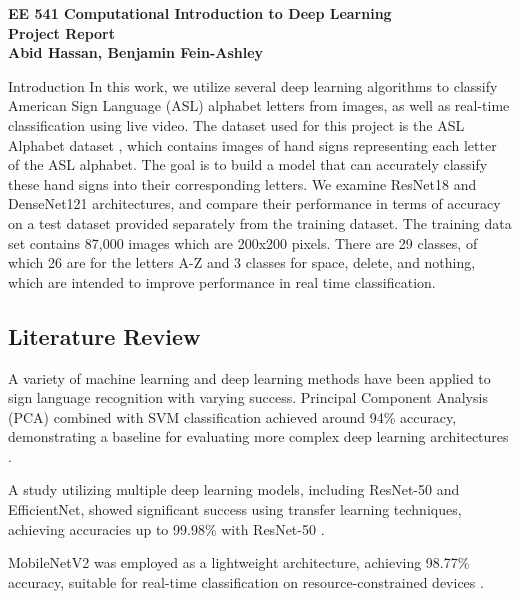 \documentclass[12pt, a4paper]{article}
\newcommand{\coursename}{EE 541 Computational Introduction to Deep Learning}
\newcommand{\doctitle}{Project Report}
\newcommand{\name}{Abid Hassan, Benjamin Fein-Ashley}
\begin{document}
\begin{center}
\small
\textbf{\coursename} \\
\Large
\bfseries
\doctitle \\
\vspace{0.8cm}
\small
{\normalfont\small \name}
\end{center}

\thispagestyle{plain}

\noindent

\newpage

\begin{section}{Introduction}
    In this work, we utilize several deep learning algorithms to classify American Sign Language (ASL) alphabet letters from images, as well as real-time classification using live video. The dataset used for this project is the ASL Alphabet dataset \cite{kaggle2022aslalphabet}, which contains images of hand signs representing each letter of the ASL alphabet. The goal is to build a model that can accurately classify these hand signs into their corresponding letters.
    We examine ResNet18 and DenseNet121 architectures, and compare their performance in terms of accuracy on a test dataset provided separately from the training dataset. The training data set contains 87,000 images which are 200x200 pixels. There are 29 classes, of which 26 are for the letters A-Z and 3 classes for space, delete, and nothing, which are intended to improve performance in real time classification.
    
    \subsection{Literature Review}
    A variety of machine learning and deep learning methods have been applied to sign language recognition with varying success.
    Principal Component Analysis (PCA) combined with SVM classification achieved around 94\% accuracy, demonstrating a baseline for evaluating more complex deep learning architectures \cite{mdpi2023resnet}.
    
    A study utilizing multiple deep learning models, including ResNet-50 and EfficientNet, showed significant success using transfer learning techniques, achieving accuracies up to 99.98\% with ResNet-50 \cite{mdpi2023resnet}.
    
    MobileNetV2 was employed as a lightweight architecture, achieving 98.77\% accuracy, suitable for real-time classification on resource-constrained devices \cite{techscience2022mobilenet}.
    

\end{section}
\end{document}
